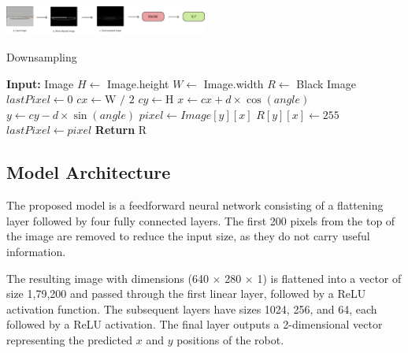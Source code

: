 \documentclass[a4paper]{article}
\begin{document}
\begin{multicols}{2}
\par \noindent

{ \centering
  \includegraphics[width=0.5\textwidth]{../results/Flowchart.png}\\
  \label{fig:flowchart}
}
\begin{algorithm}[H]
  \caption{Downsampling}
\begin{algorithmic}[1]
\Statex \textbf{Input: }Image
\State $H \gets$ Image.height
\State $W \gets$ Image.width
\State $R \gets$ Black Image
    \State $lastPixel \gets 0$
    \State $cx \gets \text{W / 2}$
    \State $cy \gets \text{H}$
        \State $x \gets cx + d \times \cos(angle)$
        \State $y \gets cy - d \times \sin(angle)$
          \State $pixel \gets Image[y][x]$
            \State $R[y][x] \gets 255 $ 
          \EndIf
          \State $lastPixel \gets pixel$
        \EndIf
    \EndFor
\EndFor
\State \textbf{Return} R
\end{algorithmic}
\end{algorithm}

\subsection{Model Architecture}
\par \noindent
The proposed model is a feedforward neural network consisting of a flattening layer followed 
by four fully connected layers. The first 200 pixels from the top of the image are removed 
to reduce the input size, as they do not carry useful information.

\par \noindent
The resulting image with dimensions (640 $\times$ 280 $\times$ 1) is flattened into a vector 
of size 1,79,200 and passed through the first linear layer, followed by a ReLU activation function.
The subsequent layers have sizes 1024, 256, and 64, each followed by a ReLU activation. 
The final layer outputs a 2-dimensional vector representing the predicted $x$ and $y$ positions of the robot.


\end{multicols}
\end{document}
